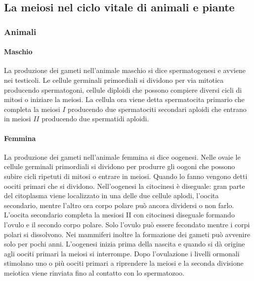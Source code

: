 \subsection{La meiosi nel ciclo vitale di animali e piante}
\subsubsection{Animali}
\paragraph{Maschio}
La produzione dei gameti nell'animale maschio si dice spermatogenesi e avviene nei testicoli. Le cellule germinali primordiali si dividono per via mitotica producendo spermatogoni, cellule diploidi che
possono compiere diversi cicli di mitosi o iniziare la meiosi. La cellula ora viene detta spermatocita primario che completa la meiosi $I$ producendo due spermatociti secondari aploidi che entrano in
meiosi $II$ producendo due spermatidi aploidi. 
\paragraph{Femmina}
La produzione dei gameti nell'animale femmina si dice oogenesi. Nelle ovaie le cellule germinali primordiali si dividono per produrre gli oogoni che possono subire cicli ripetuti di mitosi o entrare in
meiosi. Quando lo fanno vengono detti oociti primari che si dividono. Nell'oogenesi la citocinesi \`e diseguale: gran parte del citoplasma viene localizzato in una delle due cellule aplodi, l'oocita
secondario, mentre l'altro ora corpo polare pu\`o ancora dividersi o non farlo. L'oocita secondario completa la mesiosi II con citocinesi diseguale formando l'ovulo e il secondo corpo polare. Solo
l'ovulo pu\`o essere fecondato mentre i corpi polari si dissolvono. Nei mammiferi inoltre la formazione dei gameti pu\`o avvenire solo per pochi anni. L'oogenesi inizia prima della nascita e quando si
d\`a origine agli oociti primari la meiosi si interrompe. Dopo l'ovulazione i livelli ormonali stimolano uno o pi\`u oociti primari a riprendere la meiosi e la seconda divisione meiotica viene rinviata 
fino al contatto con lo spermatozoo. 
